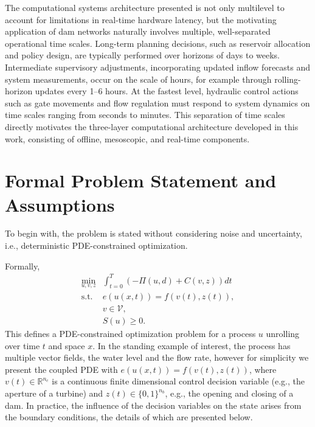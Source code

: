 \documentclass{article}
\newcommand{\1}{\mathds{1}}          %
\theoremstyle{definition}
\begin{document}
\begin{sloppypar}
The computational systems architecture presented is not only multilevel to account for limitations in real-time hardware latency, but the motivating application of dam networks naturally involves multiple, well-separated operational time scales. Long-term planning decisions, such as reservoir allocation and policy design, are typically performed over horizons of days to weeks. Intermediate supervisory adjustments, incorporating updated inflow forecasts and system measurements, occur on the scale of hours, for example through rolling-horizon updates every 1–6 hours. At the fastest level, hydraulic control actions such as gate movements and flow regulation must respond to system dynamics on time scales ranging from seconds to minutes. This separation of time scales directly motivates the three-layer computational architecture developed in this work, consisting of offline, mesoscopic, and real-time components.


\section{Formal Problem Statement and Assumptions}

To begin with, the problem is stated without considering noise and uncertainty, i.e., deterministic PDE-constrained optimization. 

Formally,
\begin{equation}\label{eq:pdeopt}
\begin{array}{rl}
\min\limits_{u,v,z} & \int_{t=0}^T \left(-\Pi(u,d)+C(v,z)\right) dt\\
\text{s.t. } & e(u(x,t)) = f(v(t),z(t)),\\ 
& v\in\mathcal{V},\\
& S(u)\ge 0.
\end{array}
\end{equation}
This defines a PDE-constrained optimization problem for a process $u$ unrolling over time $t$ and space $x$. In the standing example of interest, the process has multiple vector fields, the water level and the flow rate, however for simplicity we present the coupled PDE with $e(u(x,t)) = f(v(t),z(t))$, where $v(t)\in \mathbb{R}^{n_c}$ is a continuous finite dimensional control decision variable (e.g., the aperture of a turbine) and $z(t)\in\{0,1\}^{n_b}$, e.g., the opening and closing of a dam. 
In practice, the influence of the decision variables on the state arises from the boundary conditions, the details of which are presented below. 


\end{sloppypar}
\end{document}
